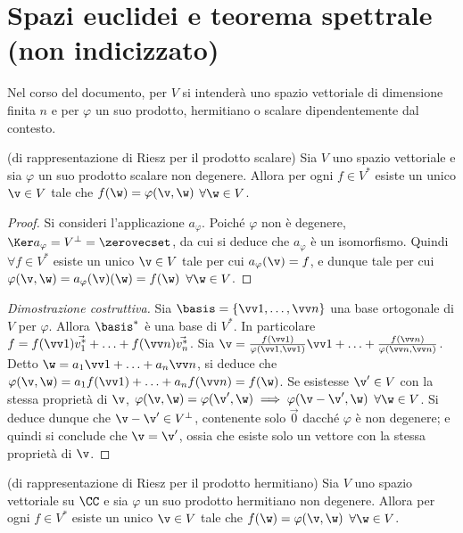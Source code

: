 \chapter{Spazi euclidei e teorema spettrale (non indicizzato)}

\begin{note}
	Nel corso del documento, per $V$ si intenderà uno spazio vettoriale di dimensione
	finita $n$ e per $\varphi$ un suo prodotto, hermitiano o scalare
	dipendentemente dal contesto.
\end{note}

\begin{theorem} (di rappresentazione di Riesz per il prodotto scalare) 
	Sia $V$ uno spazio vettoriale e sia $\varphi$ un suo prodotto scalare
	non degenere. Allora per ogni $f \in V^*$ esiste un unico $\v \in V$ tale che
	$f(\w) = \varphi(\v, \w)$ $\forall \w \in V$.
\end{theorem}

\begin{proof}
	Si consideri l'applicazione $a_\varphi$. Poiché $\varphi$ non è degenere, $\Ker a_\varphi = V^\perp = \zerovecset$, da cui si deduce che $a_\varphi$ è un isomorfismo. Quindi $\forall f \in V^*$ esiste
	un unico $\v \in V$ tale per cui $a_\varphi(\v) = f$, e dunque tale per cui $\varphi(\v, \w) = a_\varphi(\v)(\w) = f(\w)$ $\forall \w \in V$.
\end{proof}

\begin{proof}[Dimostrazione costruttiva]
	Sia $\basis = \{ \vv 1, \ldots, \vv n \}$ una base ortogonale di $V$ per $\varphi$. Allora $\basis^*$ è una base di $V^*$. In
	particolare $f = f(\vv 1) \vec{v_1^*} + \ldots + f(\vv n) \vec{v_n^*}$. Sia $\v = \frac{f(\vv 1)}{\varphi(\vv 1, \vv 1)} \vv 1 + \ldots + \frac{f(\vv n)}{\varphi(\vv n, \vv n)}$. Detto $\w = a_1 \vv 1 + \ldots + a_n \vv n$,
	si deduce che $\varphi(\v, \w) = a_1 f(\vv 1) + \ldots + a_n f(\vv n) = f(\w)$. Se esistesse $\v' \in V$ con
	la stessa proprietà di $\v$, $\varphi(\v, \w) = \varphi(\v', \w) \implies \varphi(\v - \v', \w)$ $\forall \w \in V$. Si deduce dunque che $\v - \v' \in V^\perp$, contenente solo $\vec 0$ dacché $\varphi$ è non degenere;
	e quindi si conclude che $\v = \v'$, ossia che esiste solo un vettore con la stessa proprietà di $\v$.
\end{proof}

\begin{theorem} (di rappresentazione di Riesz per il prodotto hermitiano)
	Sia $V$ uno spazio vettoriale su $\CC$ e sia $\varphi$ un suo prodotto hermitiano non
	degenere. Allora per ogni $f \in V^*$ esiste un unico $\v \in V$ tale che
	$f(\w) = \varphi(\v, \w)$ $\forall \w \in V$.
\end{theorem}

